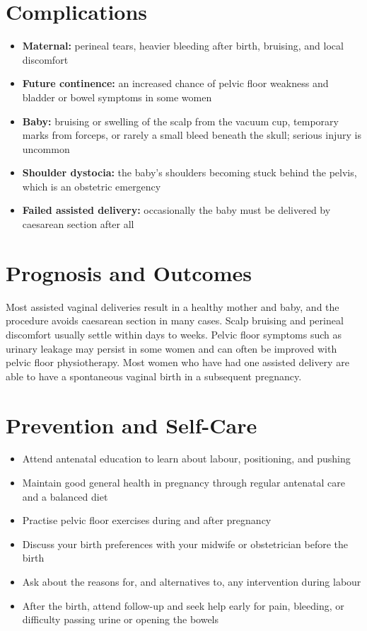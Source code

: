 \section*{Complications}
\begin{itemize}
    \item \textbf{Maternal:} perineal tears, heavier bleeding after birth, bruising, and local discomfort
    \item \textbf{Future continence:} an increased chance of pelvic floor weakness and bladder or bowel symptoms in some women
    \item \textbf{Baby:} bruising or swelling of the scalp from the vacuum cup, temporary marks from forceps, or rarely a small bleed beneath the skull; serious injury is uncommon
    \item \textbf{Shoulder dystocia:} the baby's shoulders becoming stuck behind the pelvis, which is an obstetric emergency
    \item \textbf{Failed assisted delivery:} occasionally the baby must be delivered by caesarean section after all
\end{itemize}

\section*{Prognosis and Outcomes}
Most assisted vaginal deliveries result in a healthy mother and baby, and the procedure avoids caesarean section in many cases. Scalp bruising and perineal discomfort usually settle within days to weeks. Pelvic floor symptoms such as urinary leakage may persist in some women and can often be improved with pelvic floor physiotherapy. Most women who have had one assisted delivery are able to have a spontaneous vaginal birth in a subsequent pregnancy.

\section*{Prevention and Self-Care}
\begin{itemize}
    \item Attend antenatal education to learn about labour, positioning, and pushing
    \item Maintain good general health in pregnancy through regular antenatal care and a balanced diet
    \item Practise pelvic floor exercises during and after pregnancy
    \item Discuss your birth preferences with your midwife or obstetrician before the birth
    \item Ask about the reasons for, and alternatives to, any intervention during labour
    \item After the birth, attend follow-up and seek help early for pain, bleeding, or difficulty passing urine or opening the bowels
\end{itemize}

